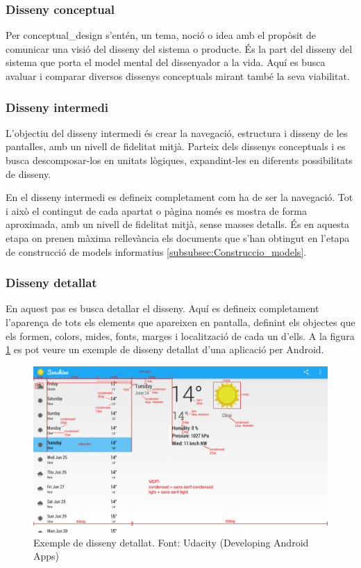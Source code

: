 \subsubsection{Disseny conceptual}
Per \gls{conceptual_design} s'entén, un tema, noció o idea amb el propòsit de comunicar una visió del disseny del sistema o producte. És la part del disseny del sistema que porta el model mental del dissenyador a la vida. 
Aquí es busca avaluar i comparar diversos dissenys conceptuals mirant també la seva viabilitat. 

\subsubsection{Disseny intermedi}
L'objectiu del disseny intermedi és crear la navegació, estructura i disseny de les pantalles, amb un nivell de fidelitat mitjà. Parteix dels dissenys conceptuals i es busca descomposar-los en unitats lògiques, expandint-les en diferents possibilitats de disseny. 

En el disseny intermedi es defineix completament com ha de ser la navegació. Tot i això el contingut de cada apartat o pàgina només es mostra de forma aproximada, amb un nivell de fidelitat mitjà, sense masses detalls. 
És en aquesta etapa on prenen màxima rellevància els documents que s'han obtingut en l'etapa de construcció de models informatius \ref{subsubsec:Construccio_models}.

\subsubsection{Disseny detallat}
En aquest pas es busca detallar el disseny. Aquí es defineix completament l'aparença de tots els elements que apareixen en pantalla, definint els objectes que els formen, colors, mides, fonts, marges i localització de cada un d'ells. A la figura \ref{fig:design_Sunshine} es pot veure un exemple de disseny detallat d'una aplicació per \gls{Android}.

\begin{figure}[ht]
\centering
\includegraphics[scale=0.17]{Sunshine_detailed_design.png}
\caption{Exemple de disseny detallat. Font: Udacity (Developing Android Apps) \cite{developing_android_apps}}
\label{fig:design_Sunshine}
\end{figure}

